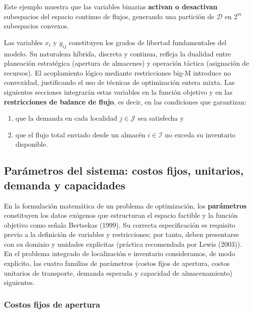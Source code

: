 \documentclass[
  spanish,
  us-letterpaper,
  DIV=11,
  numbers=noendperiod]{scrreprt}
\providecommand{\tightlist}{%
  \setlength{\itemsep}{0pt}\setlength{\parskip}{0pt}}
\numberwithin{equation}{section}
\begin{document}
Este ejemplo muestra que las variables binarias \textbf{activan o
desactivan} subespacios del espacio continuo de flujos, generando una
partición de \(\mathcal{D}\) en \(2^m\) subespacios convexos.

Las variables \(x_i\) y \(y_{ij}\) constituyen los grados de libertad
fundamentales del modelo. Su naturaleza híbrida, discreta y continua,
refleja la dualidad entre planeación estratégica (apertura de almacenes)
y operación táctica (asignación de recursos). El acoplamiento lógico
mediante restricciones big-M introduce no convexidad, justificando el
uso de técnicas de optimización entera mixta. Las siguientes secciones
integrarán estas variables en la función objetivo y en las
\textbf{restricciones de balance de flujo}, es decir, en las condiciones
que garantizan:

\begin{enumerate}
\def\labelenumi{(\roman{enumi})}
\tightlist
\item
  que la demanda en cada localidad \(j \in \mathcal{J}\) sea satisfecha
  y
\item
  que el flujo total enviado desde un almacén \(i \in \mathcal{I}\) no
  exceda su inventario disponible.
\end{enumerate}

\subsection{Parámetros del sistema: costos fijos, unitarios, demanda y
capacidades}\label{paruxe1metros-del-sistema-costos-fijos-unitarios-demanda-y-capacidades}

En la formulación matemática de un problema de optimización, los
\textbf{parámetros} constituyen los datos exógenos que estructuran el
espacio factible y la función objetivo como señala Bertsekas (1999). Su
correcta especificación es requisito previo a la definición de variables
y restricciones; por tanto, deben presentarse con su dominio y unidades
explícitas (práctica recomendada por Lewis (2003)). En el problema
integrado de localización e inventario consideramos, de modo explícito,
las cuatro familias de parámetros (costos fijos de apertura, costos
unitarios de transporte, demanda esperada y capacidad de almacenamiento)
siguientes.

\subsubsection{Costos fijos de apertura}\label{costos-fijos-de-apertura}
\end{document}
